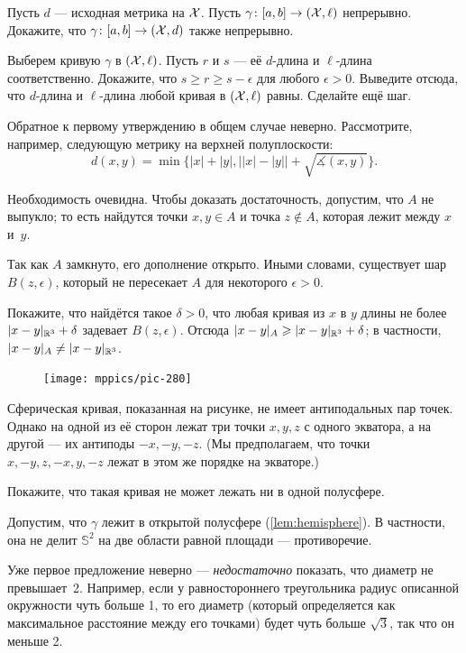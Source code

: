 \begin{multicols}{2}
Пусть $d$ — исходная метрика на $\mathcal{X}$.
Пусть $\gamma\colon[a,b]\to (\mathcal{X},\ell)$ непрерывно.
Докажите, что $\gamma\colon[a,b]\to (\mathcal{X},d)$ также непрерывно.

Выберем кривую $\gamma$ в $(\mathcal{X},\ell)$.
Пусть $r$ и $s$ --- её $d$-длина и $\ell$-длина соответственно.
Докажите, что $s\ge r\ge s-\epsilon$ для любого $\epsilon>0$.
Выведите отсюда, что $d$-длина и $\ell$-длина любой кривая в $(\mathcal{X},\ell)$ равны.
Сделайте ещё шаг.

 Обратное к первому утверждению в общем случае неверно.
Рассмотрите, например, следующую метрику на верхней полуплоскости:
\[d(x,y)=\min\{|x|+|y|,\bigl||x|-|y|\bigr|+\sqrt{\measuredangle(x,y)}\}.\]

Необходимость очевидна.
Чтобы доказать достаточность, допустим, что $A$ не выпукло;
то есть найдутся точки $x,y\in A$ и точка $z\notin A$, которая лежит между $x$ и~$y$.

Так как $A$ замкнуто, его дополнение открыто.
Иными словами, существует шар $B(z,\epsilon)$, который не пересекает $A$ для некоторого $\epsilon>0$.

Покажите, что найдётся такое $\delta>0$, что любая кривая из $x$ в $y$ длины не более $\dist{x}{y}{\mathbb{R}^3}+\delta$ задевает $B(z,\epsilon)$.
Отсюда $\dist{x}{y}A\z\ge \dist{x}{y}{\mathbb{R}^3}+\delta$; 
в частности, $\dist{x}{y}A\ne \dist{x}{y}{\mathbb{R}^3}$.

\begin{figure}
\vskip-4mm
\centering
\texttt{[image: mppics/pic-280]}
\vskip0mm
\end{figure}

Сферическая кривая, показанная на рисунке, не имеет антиподальных пар точек.
Однако на одной из её сторон лежат три точки $x,y,z$ с одного экватора, а на другой --- их антиподы $-x,-y,-z$.
(Мы предполагаем, что точки $x,-y,z,-x,y,-z$ лежат в этом же порядке на экваторе.)

Покажите, что такая кривая не может лежать ни в одной полусфере.

Допустим, что $\gamma$ лежит в открытой полусфере (\ref{lem:hemisphere}).
В частности, она не делит $\mathbb{S}^2$ на две области равной площади --- противоречие.

Уже первое предложение неверно --- \textit{недостаточно} показать, что диаметр не превышает~2.
Например, если у равностороннего треугольника радиус описанной окружности чуть больше 1,
то его диаметр (который определяется как максимальное расстояние между его точками) будет чуть больше $\sqrt3$, так что он меньше 2.


\end{multicols}
